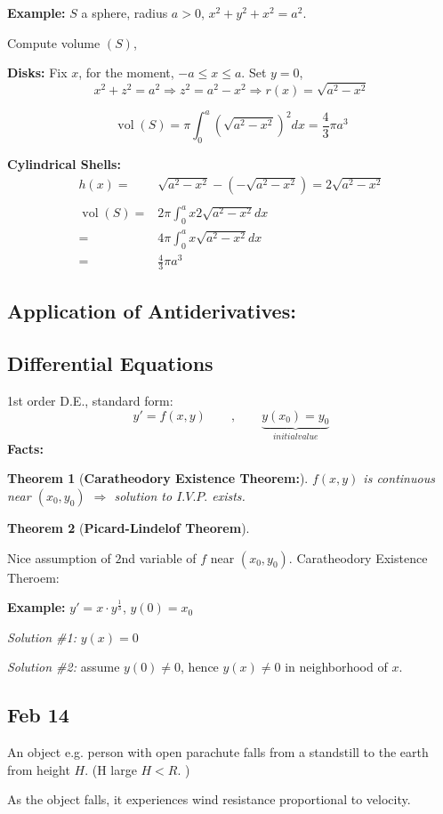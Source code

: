\documentclass[12pt]{article}
\theoremstyle{plain}
\newtheorem{theorem}{Theorem}[subsection]
\DeclareMathOperator{\Vol}{vol}
\begin{document}
{\color{Brown}
	\textbf{Example: }
	$S$ a sphere, radius $a > 0$, $x^2+y^2+x^2 = a^2$. 

	Compute volume $(S)$, 

	\textbf{Disks: }
	Fix $x$, for the moment, $-a \leq x \leq a$. Set $y =0$, 
	\[
		x^2+z^2 = a^2 \Rightarrow z^2=a^2-x^2 \Rightarrow r(x) = \sqrt{a^2-x^2}
	\]

	\[
		\Vol(S) = \pi \int_0^a (\sqrt{a^2-x^2})^2dx = \frac 43 \pi a^3
	\]
	
	\textbf{Cylindrical Shells: }
	\begin{align*}
		h(x) =& \sqrt{a^2-x^2}-(-\sqrt{a^2-x^2}) = 2\sqrt{a^2-x^2}\\\\
		\Vol(S) =& 2\pi \int_0^a x 2\sqrt{a^2-x^2}dx \\
		=& 4\pi \int_0^a x\sqrt{a^2-x^2}dx \\
		=& \frac 43 \pi a^3
	\end{align*}

}

\newpage
	\subsection{Application of Antiderivatives: }

	\textbf{}

	\subsection{Differential Equations}
	1st order D.E., standard form: 
	\[
		y' = f(x,y) \qquad , \qquad \underbrace{y(x_0) = y_0}_{initial
		value}
	\]
	\textbf{Facts:} 
	\begin{theorem}[\textbf{Caratheodory Existence Theorem:}]
		$f(x,y)$ is continuous near $(x_0, y_0)$ $\Rightarrow$ solution to
		$I.V.P.$ exists. 
	\end{theorem}
	\begin{theorem}[\textbf{Picard-Lindelof Theorem}]
	\end{theorem}
	Nice assumption of $2$nd variable of $f$ near $(x_0, y_0)$. 
	Caratheodory Existence Theroem: 

	{\color{Brown}
	\textbf{Example: }
	$y' = x \cdot y^{\frac 13}$, $y(0)=x_0$

	\textit{Solution \#1:} $y(x) = 0$ 
	
	\textit{Solution \#2:} assume $y(0)\neq 0$, hence $y(x)\neq 0$ in 
	neighborhood of $x$. 
	}



	\newpage
	\subsection{Feb 14}
	An object e.g. person with open parachute falls from a standstill to the 
	earth from height $H$.  (H large $H < R$. ) 

	As the object falls, it experiences wind resistance proportional to
	velocity. 
\end{document}
